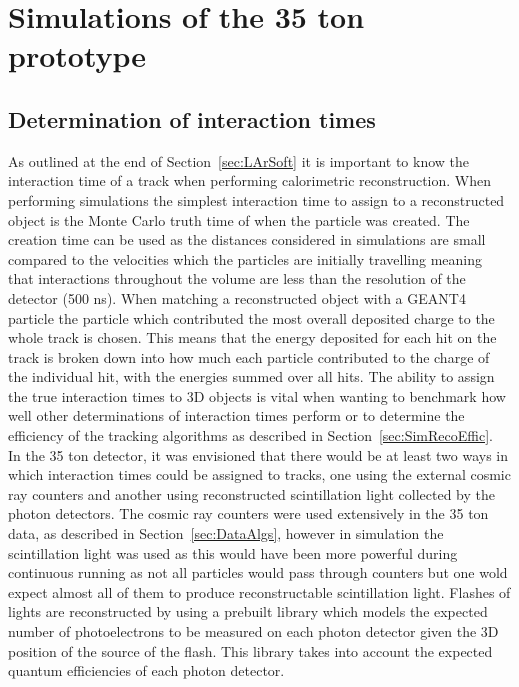 
\chapter{Simulations of the 35 ton prototype}  %

\graphicspath{{35tonSimulation/Figs/PDF/}{35tonSimulation/Figs/Raster/}{35tonSimulation/Figs/}}

\section{Determination of interaction times} \label{sec:SimInteractionTimes} %
As outlined at the end of Section~\ref{sec:LArSoft} it is important to know the interaction time of a track when performing calorimetric reconstruction. When performing simulations the simplest interaction time to assign to a reconstructed object is the Monte Carlo truth time of when the particle was created. The creation time can be used as the distances considered in simulations are small compared to the velocities which the particles are initially travelling meaning that interactions throughout the volume are less than the resolution of the detector (500 ns). When matching a reconstructed object with a GEANT4 particle the particle which contributed the most overall deposited charge to the whole track is chosen. This means that the energy deposited for each hit on the track is broken down into how much each particle contributed to the charge of the individual hit, with the energies summed over all hits. The ability to assign the true interaction times to 3D objects is vital when wanting to benchmark how well other determinations of interaction times perform or to determine the efficiency of the tracking algorithms as described in Section~\ref{sec:SimRecoEffic}. \\

In the 35 ton detector, it was envisioned that there would be at least two ways in which interaction times could be assigned to tracks, one using the external cosmic ray counters and another using reconstructed scintillation light collected by the photon detectors. The cosmic ray counters were used extensively in the 35 ton data, as described in Section~\ref{sec:DataAlgs}, however in simulation the scintillation light was used as this would have been more powerful during continuous running as not all particles would pass through counters but one wold expect almost all of them to produce reconstructable scintillation light. Flashes of lights are reconstructed by using a prebuilt library which models the expected number of photoelectrons to be measured on each photon detector given the 3D position of the source of the flash. This library takes into account the expected quantum efficiencies of each photon detector. \\

